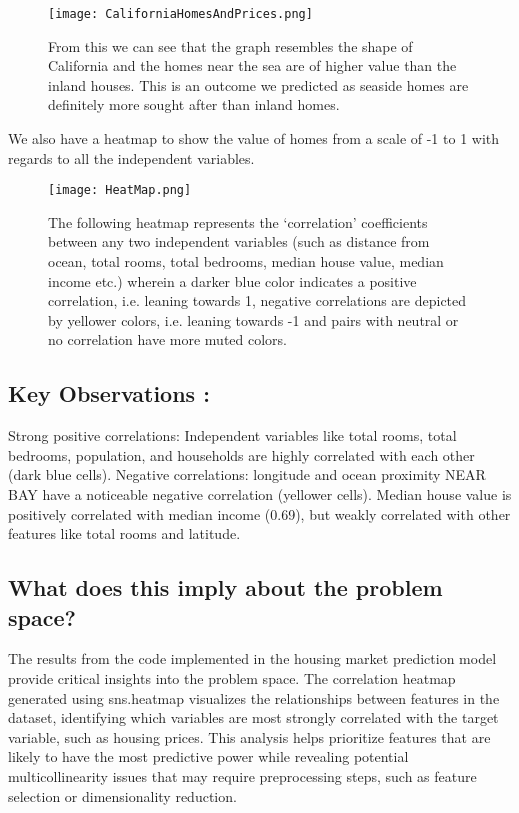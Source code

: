 \documentclass{article}
\begin{document}
\begin{figure}
    \centering
    \texttt{[image: CaliforniaHomesAndPrices.png]}
    \caption{From this we can see that the graph resembles the shape of California and the homes near the sea are of higher value than the inland houses. This is an outcome we predicted as seaside homes are definitely more sought after than inland homes.}
    \label{fig:enter-label}
\end{figure}

We also have a heatmap to show the value of homes from a scale of -1 to 1 with regards to all the independent variables. 

\begin{figure}
    \centering
    \texttt{[image: HeatMap.png]}
    \caption{The following heatmap represents the ‘correlation’ coefficients between any two independent variables (such as distance from ocean, total rooms, total bedrooms, median house value, median income etc.) wherein a darker blue color indicates a positive correlation, i.e. leaning towards 1, negative correlations are depicted by yellower colors, i.e. leaning towards -1 and pairs with neutral or no correlation have more muted colors.
}
    \label{fig:enter-label}
\end{figure}


\subsection{Key Observations : }
Strong positive correlations: Independent variables like total rooms, total bedrooms, population, and households are highly correlated with each other (dark blue cells).
Negative correlations: longitude and ocean proximity NEAR BAY have a noticeable negative correlation (yellower cells).
Median house value is positively correlated with median income (0.69), but weakly correlated with other features like total rooms and latitude.

\subsection{What does this imply about the problem space?}
The results from the code implemented in the housing market prediction model provide critical insights into the problem space. The correlation heatmap generated using sns.heatmap visualizes the relationships between features in the dataset, identifying which variables are most strongly correlated with the target variable, such as housing prices. This analysis helps prioritize features that are likely to have the most predictive power while revealing potential multicollinearity issues that may require preprocessing steps, such as feature selection or dimensionality reduction. 
\end{document}
